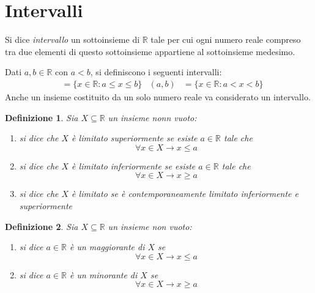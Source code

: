 \documentclass[11pt]{book}
\newtheorem{definition}{Definizione}[chapter]
\begin{document}
\section{Intervalli}
Si dice \textit{intervallo} un sottoinsieme di $\mathbb{R}$ tale per cui ogni numero reale compreso tra due elementi di 
questo sottoinsieme appartiene al sottoinsieme medesimo.

Dati $a,b\in \mathbb{R}$ con $a<b$, si definiscono i seguenti intervalli:
\begin{align*}
    [a,b]&=\{x\in\mathbb{R}:a\leq x\leq b\} & (a,b)&=\{x\in\mathbb{R}:a< x< b\}
\end{align*}
Anche un insieme costituito da un solo numero reale va considerato un intervallo.
\begin{definition}
    Sia $X\subseteq\mathbb{R}$ un insieme nonn vuoto:
    \begin{enumerate}
        \item si dice che $X$ è limitato superiormente se esiste $a\in\mathbb{R}$ tale che
        \begin{equation*}
            \forall x\in X\rightarrow x\leq a
        \end{equation*}
        \item si dice che $X$ è limitato inferiormente se esiste $a\in\mathbb{R}$ tale che
        \begin{equation*}
            \forall x\in X\rightarrow x\geq a
        \end{equation*}
        \item si dice che $X$ è limitato se è contemporaneamente limitato inferiormente e superiormente
    \end{enumerate}
\end{definition}
\begin{definition}
    Sia $X\subseteq\mathbb{R}$ un insieme non vuoto:
    \begin{enumerate}
        \item si dice $a\in\mathbb{R}$ è un maggiorante di $X$ se
        \begin{equation*}
            \forall x\in X\rightarrow x\leq a
        \end{equation*}
        \item si dice $a\in\mathbb{R}$ è un minorante di $X$ se
        \begin{equation*}
            \forall x\in X\rightarrow x\geq a
        \end{equation*}
    \end{enumerate}
\end{definition}
\end{document}
